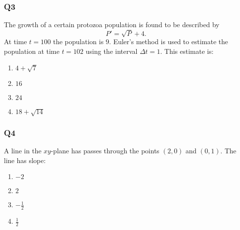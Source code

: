 \documentclass[12pt,a4paper]{article}
\begin{document}
\subsubsection*{Q3}
The growth of a certain protozoa population is found to be described by
\[
	P' = \sqrt{P} + 4.
\]
At time $t=100$ the population is $9$. Euler's method is used to estimate the population at time $t=102$ using the interval $\Delta t = 1$. This estimate is:

\begin{enumerate}[label=(\alph*)]
\item $4 + \sqrt{7}$
\item $16$
\item $24$
\item $18 + \sqrt{14}$
\end{enumerate}

\subsubsection*{Q4}
A line in the $xy$-plane has passes through the points $(2,0)$ and $(0,1)$. The line has slope:
\begin{enumerate}[label=(\alph*)]
\item $-2$
\item $2$
\item $-\frac{1}{2}$
\item $\frac{1}{2}$
\end{enumerate}

\newpage
\end{document}
